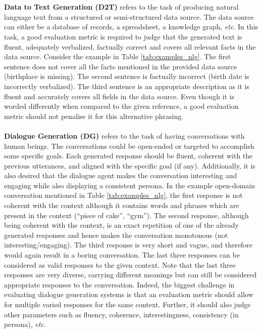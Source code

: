 \\\\
\textbf{Data to Text Generation (D2T)} refers to the task of producing natural language text from a structured or semi-structured data source. The data source can either be a database of records, a spreadsheet, a knowledge graph, \textit{etc}. In this task, a good evaluation metric is required to judge that the generated text is fluent, adequately verbalized, factually correct and covers all relevant facts in the data source. Consider the example in Table \ref{tab:examples_nlg}. The first sentence does not cover all the facts mentioned in the provided data source (birthplace is missing). The second sentence is factually incorrect (birth date is incorrectly verbalized). The third sentence is an appropriate description as it is fluent and accurately covers all fields in the data source. Even though it is worded differently when compared to the given reference, a good evaluation metric should not penalise it for this alternative phrasing.
\\\\
\textbf{Dialogue Generation (DG)} refers to the task of having conversations with human beings. The conversations could be open-ended or targeted to accomplish some specific goals. Each generated response should be fluent, coherent with the previous utterances, and aligned with the specific goal (if any). Additionally, it is also desired that the dialogue agent makes the conversation interesting and engaging while also displaying a consistent persona. In the example open-domain conversation mentioned in Table \ref{tab:examples_nlg}, the first response is not coherent with the context although it contains words and phrases which are present in the context (``piece of cake'', ``gym''). The second response, although being coherent with the context, is an exact repetition of one of the already generated responses and hence makes the conversation monotonous (not interesting/engaging). The third response is very short and vague, and therefore would again result in a boring conversation. The last three responses can be considered as valid responses to the given context. Note that the last three responses are very diverse, carrying different meanings but can still be considered appropriate responses to the conversation. Indeed, the biggest challenge in evaluating dialogue generation systems is that an evaluation metric should allow for multiple varied responses for the same context. Further, it should also judge other parameters such as fluency, coherence, interestingness, consistency (in persona), \textit{etc}.
